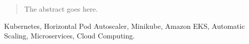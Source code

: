 \begin{abstract}
The abstract goes here.
\end{abstract}

\begin{IEEEkeywords}
Kubernetes, Horizontal Pod Autoscaler, Minikube, Amazon EKS,
Automatic Scaling, Microservices, Cloud Computing.
\end{IEEEkeywords}

%
\IEEEpeerreviewmaketitle
